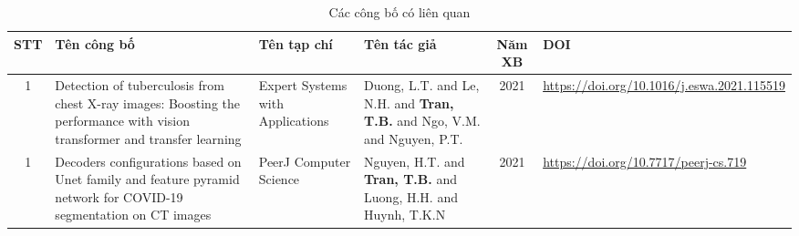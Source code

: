 \documentclass[../the.tex]{subfiles}
\begin{document}
\thispagestyle{empty}


\begin{table*}[h!]
\centering
\begin{tabularx}{\columnwidth}{|c|X|X|X|c|X|}
\hline
\textbf{STT}
& \textbf{Tên công bố}
& \textbf{Tên tạp chí}
& \textbf{Tên tác giả}
& \textbf{Năm XB}
& \textbf{DOI}
\\ \hline 

1 & Detection of tuberculosis from chest X-ray images: Boosting the performance with vision transformer and transfer learning & Expert Systems with Applications & Duong, L.T. and Le, N.H. and \textbf{Tran, T.B.} and Ngo, V.M. and Nguyen, P.T. & 2021 &
\url{https://doi.org/10.1016/j.eswa.2021.115519} \\ \hline

1 & Decoders configurations based on Unet family and feature pyramid network for COVID-19 segmentation on CT images & PeerJ Computer Science & Nguyen, H.T. and \textbf{Tran, T.B.} and Luong, H.H. and Huynh, T.K.N  & 2021 & \url{https://doi.org/10.7717/peerj-cs.719} \\ \hline

\end{tabularx}
\label{tab:mc_frac}
\caption{Các công bố có liên quan}
\end{table*}
\end{document}
